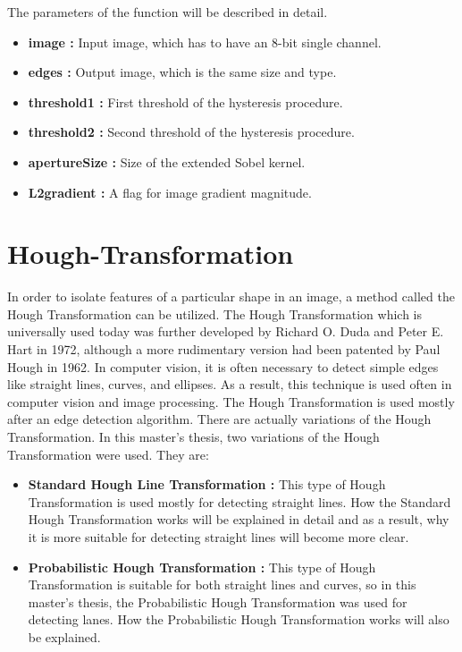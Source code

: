  The parameters of the function will be described in detail.\cite{Canny_Edge_Detector3}
 
     \begin{itemize}

\item \textbf{image : }Input image, which has to have an 8-bit single channel.

\item \textbf{edges : }Output image, which is the same size and type.

\item \textbf{threshold1 : }First threshold of the hysteresis procedure.

\item \textbf{threshold2 : }Second threshold of the hysteresis procedure.

\item \textbf{apertureSize : }Size of the extended Sobel kernel.

\item \textbf{L2gradient : }A flag for image gradient magnitude.

\end{itemize}
 
%
\section{Hough-Transformation}\label{sec:Hough-Transformation}
%
In order to isolate features of a particular shape in an image, a method called the Hough Transformation can be utilized. The Hough Transformation which is universally used today was further developed by Richard O. Duda and Peter E. Hart in 1972, although a more rudimentary version had been patented by Paul Hough in 1962.\cite{Hough_Transformation} In computer vision, it is often necessary to detect simple edges like straight lines, curves, and ellipses. As a result, this technique is used often in computer vision and image processing. The Hough Transformation is used mostly after an edge detection algorithm. There are actually variations of the Hough Transformation. In this master's thesis, two variations of the Hough Transformation were used. They are:

\begin{itemize}

\item \textbf{Standard Hough Line Transformation : }This type of Hough Transformation is used mostly for detecting straight lines. How the Standard Hough Transformation works will be explained in detail and as a result, why it is more suitable for detecting straight lines will become more clear.

\item \textbf{Probabilistic Hough Transformation : }This type of Hough Transformation is suitable for both straight lines and curves, so in this master's thesis, the Probabilistic Hough Transformation was used for detecting lanes. How the Probabilistic Hough Transformation works will also be explained.

\end{itemize}
%
